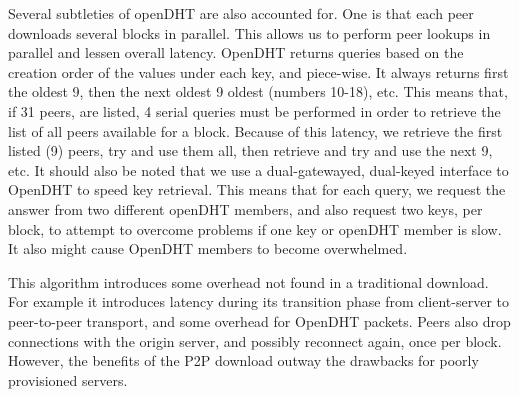 Several subtleties of openDHT are also accounted for.  One is that each peer downloads several blocks in parallel.  This allows us to perform peer lookups in parallel and lessen overall latency.  
OpenDHT returns queries based on the creation order of the values under each key, and piece-wise.  It always returns first the oldest 9, then the next oldest 9 oldest (numbers 10-18), etc.  This means that, if 31 peers, are listed, 4 serial queries must be performed in order to retrieve the list of all peers available for a block. Because of this latency, we retrieve the first listed (9) peers, try and use them all, then retrieve and try and use the next 9, etc. 
It should also be noted that we use a dual-gatewayed, dual-keyed interface to OpenDHT to speed key retrieval.  This means that for each query, we request the answer from two different openDHT members, and also request two keys, per block, to attempt to overcome problems if one key or openDHT member is slow.  It also might cause OpenDHT members to become overwhelmed.

This algorithm introduces some overhead not found in a traditional download.  For example it introduces latency during its transition phase from client-server to peer-to-peer transport, and some overhead for OpenDHT packets.  Peers also drop connections with the origin server, and possibly reconnect again, once per block.  However, the benefits of the P2P download outway the drawbacks for poorly provisioned servers.

